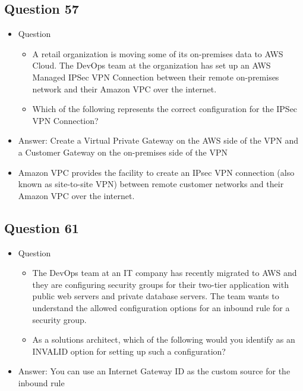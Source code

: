 \documentclass[]{scrartcl}
\begin{document}
\subsection{Question 57}
\begin{itemize}
	\item Question
	\begin{itemize}
		\item A retail organization is moving some of its on-premises data to AWS Cloud. The DevOps team at the organization has set up an AWS Managed IPSec VPN Connection between their remote on-premises network and their Amazon VPC over the internet.
		\item Which of the following represents the correct configuration for the IPSec VPN Connection?
	\end{itemize}
	\item Answer: Create a Virtual Private Gateway on the AWS side of the VPN and a Customer Gateway on the on-premises side of the VPN
	\item Amazon VPC provides the facility to create an IPsec VPN connection (also known as site-to-site VPN) between remote customer networks and their Amazon VPC over the internet. 
\end{itemize}

\subsection{Question 61}
\begin{itemize}
	\item Question
	\begin{itemize}
		\item The DevOps team at an IT company has recently migrated to AWS and they are configuring security groups for their two-tier application with public web servers and private database servers. The team wants to understand the allowed configuration options for an inbound rule for a security group.
		\item As a solutions architect, which of the following would you identify as an INVALID option for setting up such a configuration?
	\end{itemize}
	\item Answer: You can use an Internet Gateway ID as the custom source for the inbound rule
\end{itemize}
\end{document}

